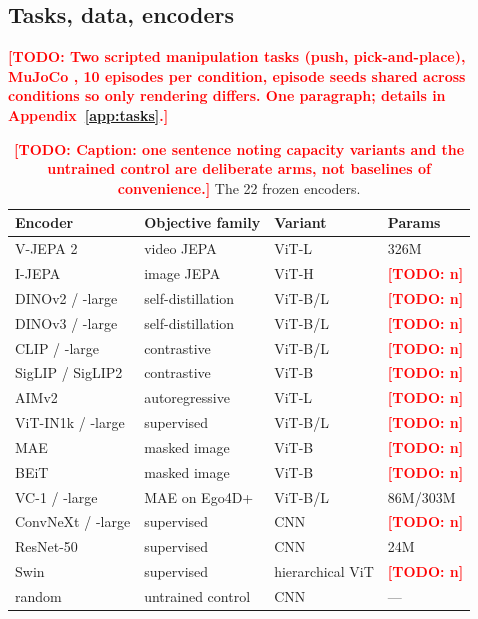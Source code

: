 \documentclass[10pt]{article}
\newcommand{\TODO}[1]{\textcolor{red}{\textbf{[TODO: #1]}}}
\begin{document}
\subsection{Tasks, data, encoders}
\TODO{Two scripted manipulation tasks (push, pick-and-place), MuJoCo
\citep{todorov2012mujoco}, 10 episodes per condition, episode seeds shared
across conditions so only rendering differs. One paragraph; details in
Appendix~\ref{app:tasks}.}

\begin{table}[t]
\centering\small
\caption{\TODO{Caption: one sentence noting capacity variants and the
untrained control are deliberate arms, not baselines of convenience.} The 22
frozen encoders.}
\label{tab:encoders}
\begin{tabular}{llll}
\toprule
Encoder & Objective family & Variant & Params \\
\midrule
V-JEPA 2 \citep{vjepa2_2025} & video JEPA & ViT-L & 326M \\
I-JEPA \citep{assran2023ijepa} & image JEPA & ViT-H & \TODO{n} \\
DINOv2 / -large \citep{oquab2023dinov2} & self-distillation & ViT-B/L & \TODO{n} \\
DINOv3 / -large \citep{dinov3_2025} & self-distillation & ViT-B/L & \TODO{n} \\
CLIP / -large \citep{radford2021clip} & contrastive & ViT-B/L & \TODO{n} \\
SigLIP / SigLIP2 \citep{zhai2023siglip,tschannen2025siglip2} & contrastive & ViT-B & \TODO{n} \\
AIMv2 \citep{fini2024aimv2} & autoregressive & ViT-L & \TODO{n} \\
ViT-IN1k / -large \citep{dosovitskiy2021vit} & supervised & ViT-B/L & \TODO{n} \\
MAE \citep{he2022mae} & masked image & ViT-B & \TODO{n} \\
BEiT \citep{bao2022beit} & masked image & ViT-B & \TODO{n} \\
VC-1 / -large \citep{majumdar2023cortexbench} & MAE on Ego4D+ & ViT-B/L & 86M/303M \\
ConvNeXt / -large \citep{liu2022convnext} & supervised & CNN & \TODO{n} \\
ResNet-50 \citep{he2016resnet} & supervised & CNN & 24M \\
Swin \citep{liu2021swin} & supervised & hierarchical ViT & \TODO{n} \\
random & untrained control & CNN & --- \\
\bottomrule
\end{tabular}
\end{table}
\end{document}
